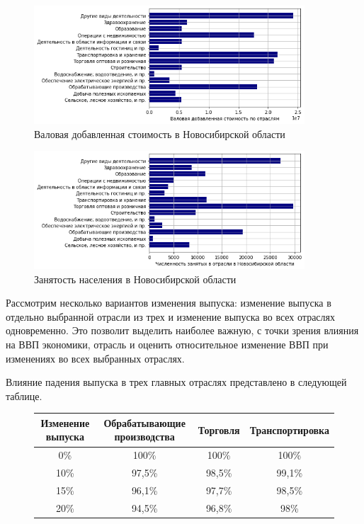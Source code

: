 \documentclass[12pt, a4paper]{article}
\begin{document}
\begin{figure}[h]
\includegraphics[width=0.9\textwidth]{pictures/VDS.png}
\caption{Валовая добавленная стоимость в Новосибирской области}
\end{figure}

\begin{figure}[h]
\includegraphics[width=0.9\textwidth]{pictures/labour.png}
\caption{Занятость населения в Новосибирской области}
\end{figure}
Рассмотрим несколько вариантов изменения выпуска: изменение выпуска в отдельно выбранной отрасли из трех и изменение выпуска во всех отраслях одновременно. Это позволит выделить наиболее важную, с точки зрения влияния на ВВП экономики, отрасль и оценить относительное изменение ВВП при изменениях во всех выбранных отраслях.

Влияние падения выпуска в трех главных отраслях представлено в следующей таблице.

\begin{figure}[h]
\begin{tabular}{|c|c|c|c|}
\hline
Изменение выпуска & Обрабатывающие производства & Торговля & Транспортировка\\
\hline
0\% & 100\% & 100\% & 100\%\\
10\% & 97,5\% &98,5\% & 99,1\%\\
15\% & 96,1\%& 97,7\%& 98,5\%\\
20\% & 94,5\%& 96,8\%& 98\%\\
\hline
\end{tabular}

\end{figure}
\end{document}
